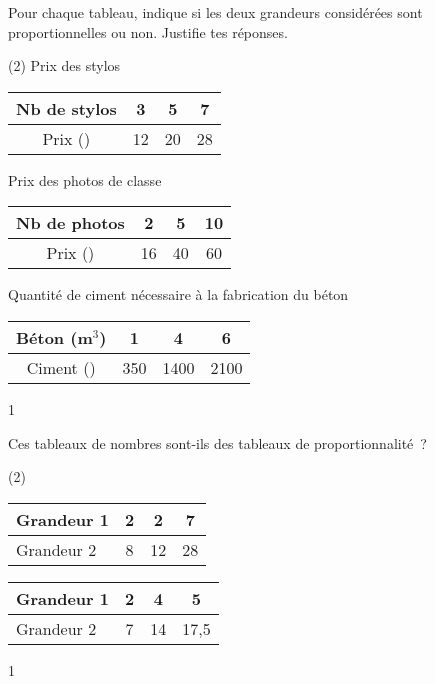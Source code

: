 \documentclass[a4paper,11pt]{report}
\begin{document}
\begin{exo}{
Pour chaque tableau, indique si les deux grandeurs considérées sont proportionnelles ou non. Justifie tes réponses.
\begin{tasks}(2)
\task Prix des stylos
\vspace{-0.3cm}
\begin{center}
\begin{tabular}{|c|c|c|c|}\hline
Nb de stylos & 3 & 5 & 7 \\\hline
Prix (\tunit{}{\fr}) & 12 & 20 & 28 \\\hline
\end{tabular}
\end{center}
\task Prix des photos de classe
\vspace{-0.3cm}
\begin{center}
\begin{tabular}{|c|c|c|c|}\hline
Nb de photos & 2 & 5 & 10 \\\hline
Prix (\tunit{}{\fr}) & 16 & 40 & 60 \\\hline
\end{tabular}
\end{center}
\task Quantité de ciment nécessaire à la fabrication du béton
\vspace{-0.3cm}
\begin{center}
\begin{tabular}{|c|c|c|c|}\hline
Béton (m$^3$) & 1 & 4 & 6 \\\hline
Ciment (\tunit{}{\kg}) & 350 & 1400 & 2100 \\\hline
\end{tabular}
\end{center}
\vspace{-0.3cm}
\end{tasks}}{1}

\end{exo}
\begin{exo}{
Ces tableaux de nombres sont-ils des tableaux de proportionnalité~?
\begin{tasks}(2)
\task 
\begin{tabular}{|l|c|c|c|}\hline
Grandeur 1 & 2 & 2 & 7  \\\hline
Grandeur 2 & 8 & 12 & 28  \\\hline
\end{tabular}
\task 
\begin{tabular}{|l|c|c|c|}\hline
Grandeur 1 & 2 & 4 & 5  \\\hline
Grandeur 2 & 7 &14 & 17,5  \\\hline
\end{tabular}
\end{tasks}
\medskip}{1}
\end{exo}
\end{document}
